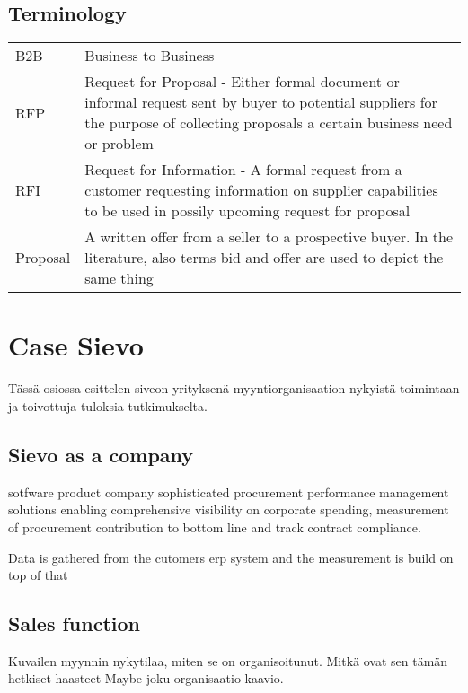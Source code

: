 \documentclass[12pt,a4paper,oneside,pdftex]{report}
\begin{document}
\section{Terminology}
\label{section:Terminology}


\noindent
\begin{longtable}{@{}p{}p{}@{}}
B2B & Business to Business \\
RFP & Request for Proposal - Either formal document or informal request sent by buyer to potential suppliers for the purpose of collecting proposals a certain business need or problem \\
RFI & Request for Information - A formal request from a customer requesting information on supplier capabilities to be used in possily upcoming request for proposal \\
Proposal  & A written offer from a seller to a prospective buyer. In the literature, also terms bid and offer are used to depict the same thing \\

\end{longtable}

% 

\chapter{Case Sievo}
\label{chapter:Case Sievo}

Tässä osiossa esittelen siveon yrityksenä myyntiorganisaation nykyistä toimintaan ja toivottuja tuloksia tutkimukselta.

\section{Sievo as a company}



sotfware product company
sophisticated procurement performance management solutions enabling comprehensive visibility on corporate spending, measurement of procurement contribution to bottom line and track contract compliance. 

Data is gathered from the cutomers erp system and the measurement is build on top of that 


\section{Sales function}

Kuvailen myynnin nykytilaa, miten se on organisoitunut. Mitkä ovat sen tämän hetkiset haasteet
Maybe joku organisaatio kaavio. 
\end{document}
